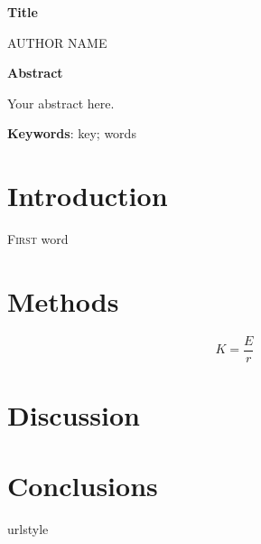 \documentclass[12pt]{extarticle}
\begin{document}


{\selectfont 
\centerline{ \huge{ \textbf{Title}\Large}
}

\bigskip
\bigskip

\centerline{ \Large AUTHOR NAME\footnotemark}


\bigskip
\bigskip
\bigskip

\thispagestyle{fancy}

\bigskip
\bigskip
\bigskip

\noindent \textbf{Abstract}

Your abstract here.

\bigskip

\textbf{Keywords}: key; words

\bigskip
\bigskip
\newpage

\section{Introduction}

\lettrine[lines=3]{F}{irst} word \lipsum[1]

\lipsum[1]

\section{Methods}
\lipsum[1]

\begin{equation}
K = \frac{E}{r}
\end{equation}

\section{Discussion}
\lipsum[1]

\section{Conclusions}
\lipsum[1]


\newpage

\begin{thebibliography}{6}
	\providecommand{\natexlab}[1]{#1}
	\expandafter\ifx\csname urlstyle\endcsname\relax
	\providecommand{\doi}[1]{doi:\discretionary{}{}{}#1}\else
	\providecommand{\doi}{doi:\discretionary{}{}{}\begingroup
		\urlstyle{rm}\Url}\fi
	

\end{thebibliography}}
\end{document}
